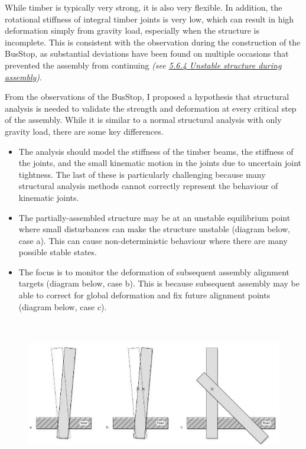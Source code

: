 \documentclass[11pt]{book}
\begin{document}
While timber is typically very strong, it is also very flexible. In addition, the rotational stiffness of integral timber joints is very low, which can result in high deformation simply from gravity load, especially when the structure is incomplete. This is consistent with the observation during the construction of the BusStop, as substantial deviations have been found on multiple occasions that prevented the assembly from continuing \textit{(see \uline{5.6.4 Unstable structure during assembly})}. 

From the observations of the BusStop, I proposed a hypothesis that structural analysis is needed to validate the strength and deformation at every critical step of the assembly. While it is similar to a normal structural analysis with only gravity load, there are some key differences. 

\begin{itemize}
	\item The analysis should model the stiffness of the timber beams, the stiffness of the joints, and the small kinematic motion in the joints due to uncertain joint tightness. The last of these is particularly challenging because many structural analysis methods cannot correctly represent the behaviour of kinematic joints. 

	\item The partially-assembled structure may be at an unstable equilibrium point where small disturbances can make the structure unstable (diagram below, case a). This can cause non-deterministic behaviour where there are many possible stable states.

	\item The focus is to monitor the deformation of subsequent assembly alignment targets (diagram below, case b). This is because subsequent assembly may be able to correct for global deformation and fix future alignment points (diagram below, case c).

\end{itemize}
\begin{figure}[H]
\includegraphics[width=15.92cm,height=6.49cm]{./images/image11.jpeg}
\end{figure}
\end{document}
